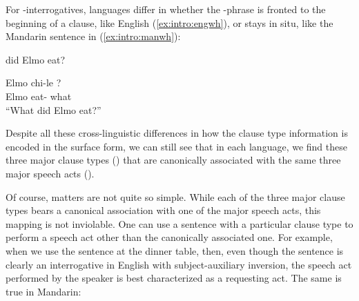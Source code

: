 
For \twh-interrogatives, languages differ in whether the \twh-phrase is fronted to the beginning of a clause,  like English (\ref{ex:intro:engwh}), or stays in situ, like the Mandarin sentence in (\ref{ex:intro:manwh}):

 did Elmo eat?
\eex

\gll Elmo chi-le ?\\
Elmo eat-\Asp{} what\\
``What did Elmo eat?''
\eex

Despite all these cross-linguistic differences in how the clause type information is encoded in the surface form, we can still see that in each language, we find these three major clause types (\diis{}) that are canonically associated with the same three major speech acts (\aqrs{}). 


Of course, matters are not quite so simple. While each of the three major clause types bears a canonical association with one of the major speech acts, this mapping is not inviolable. One can use a sentence with a particular clause type to perform a speech act other than the canonically associated one. For example, when we use the sentence  at the dinner table, then, even though the sentence is clearly an interrogative in English with subject-auxiliary inversion, the speech act performed by the speaker is best characterized as a requesting act. The same is true in Mandarin:

